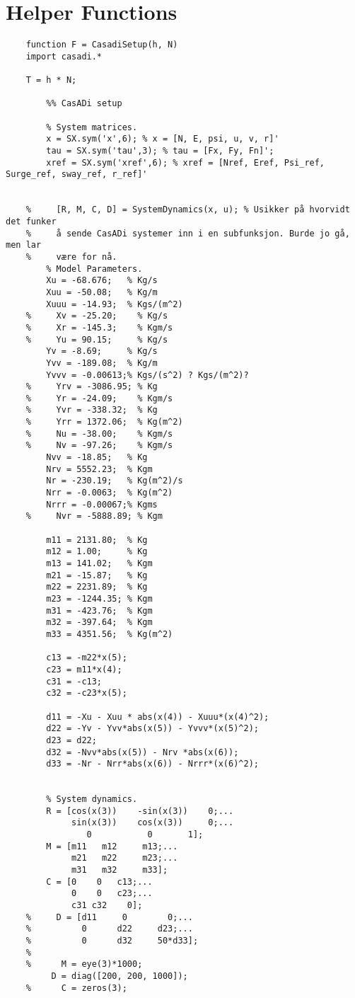 \blankpage
\section{Helper Functions}
\begin{lstlisting}
    function F = CasadiSetup(h, N)
    import casadi.*
    
    T = h * N;
    
        %% CasADi setup
        
        % System matrices.
        x = SX.sym('x',6); % x = [N, E, psi, u, v, r]'
        tau = SX.sym('tau',3); % tau = [Fx, Fy, Fn]';
        xref = SX.sym('xref',6); % xref = [Nref, Eref, Psi_ref, Surge_ref, sway_ref, r_ref]'
        
        
    %     [R, M, C, D] = SystemDynamics(x, u); % Usikker på hvorvidt det funker
    %     å sende CasADi systemer inn i en subfunksjon. Burde jo gå, men lar
    %     være for nå.
        % Model Parameters.
        Xu = -68.676;   % Kg/s
        Xuu = -50.08;   % Kg/m
        Xuuu = -14.93;  % Kgs/(m^2)
    %     Xv = -25.20;    % Kg/s
    %     Xr = -145.3;    % Kgm/s
    %     Yu = 90.15;     % Kg/s
        Yv = -8.69;     % Kg/s
        Yvv = -189.08;  % Kg/m
        Yvvv = -0.00613;% Kgs/(s^2) ? Kgs/(m^2)?
    %     Yrv = -3086.95; % Kg
    %     Yr = -24.09;    % Kgm/s
    %     Yvr = -338.32;  % Kg
    %     Yrr = 1372.06;  % Kg(m^2)
    %     Nu = -38.00;    % Kgm/s
    %     Nv = -97.26;    % Kgm/s
        Nvv = -18.85;   % Kg
        Nrv = 5552.23;  % Kgm
        Nr = -230.19;   % Kg(m^2)/s
        Nrr = -0.0063;  % Kg(m^2)
        Nrrr = -0.00067;% Kgms
    %     Nvr = -5888.89; % Kgm
        
        m11 = 2131.80;  % Kg
        m12 = 1.00;     % Kg
        m13 = 141.02;   % Kgm
        m21 = -15.87;   % Kg
        m22 = 2231.89;  % Kg
        m23 = -1244.35; % Kgm
        m31 = -423.76;  % Kgm
        m32 = -397.64;  % Kgm
        m33 = 4351.56;  % Kg(m^2)
        
        c13 = -m22*x(5);
        c23 = m11*x(4);
        c31 = -c13;
        c32 = -c23*x(5);
        
        d11 = -Xu - Xuu * abs(x(4)) - Xuuu*(x(4)^2);
        d22 = -Yv - Yvv*abs(x(5)) - Yvvv*(x(5)^2);
        d23 = d22;
        d32 = -Nvv*abs(x(5)) - Nrv *abs(x(6));
        d33 = -Nr - Nrr*abs(x(6)) - Nrrr*(x(6)^2);
        
        
        % System dynamics.
        R = [cos(x(3))    -sin(x(3))    0;...
             sin(x(3))    cos(x(3))     0;...
                0           0       1];    
        M = [m11   m12     m13;...
             m21   m22     m23;...
             m31   m32     m33];
        C = [0    0   c13;...
             0    0   c23;...
             c31 c32    0];
    %     D = [d11     0        0;...
    %          0      d22     d23;...
    %          0      d32     50*d33];
    % 
    %      M = eye(3)*1000;
         D = diag([200, 200, 1000]);
    %      C = zeros(3);
        

\end{lstlisting}
